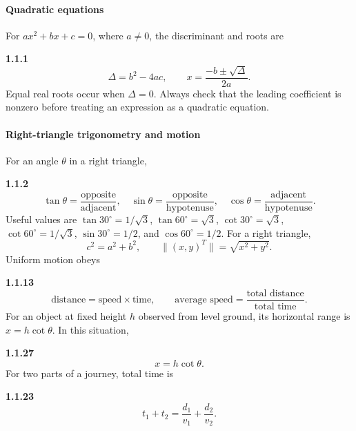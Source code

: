 \renewcommand{\theequation}{1.1.\arabic{qcurrent}.\arabic{equation}}
\setcounter{equation}{0}

\paragraph*{Quadratic equations}
For $ax^2+bx+c=0$, where $a\ne0$, the discriminant and roots are
\setcounter{qcurrent}{1}\setcounter{equation}{0}
\par\noindent\textbf{1.1.1}\quad
\begin{equation}
\Delta=b^2-4ac,\qquad x=\frac{-b\pm\sqrt{\Delta}}{2a}.
\label{eq:quad-general}
\end{equation}
Equal real roots occur when $\Delta=0$. Always check that the leading coefficient is nonzero before treating an expression as a quadratic equation.

\paragraph*{Right-triangle trigonometry and motion}
For an angle $\theta$ in a right triangle,
\setcounter{qcurrent}{2}\setcounter{equation}{0}
\par\noindent\textbf{1.1.2}\quad
\begin{equation}
\tan\theta=\frac{\text{opposite}}{\text{adjacent}},\quad
\sin\theta=\frac{\text{opposite}}{\text{hypotenuse}},\quad
\cos\theta=\frac{\text{adjacent}}{\text{hypotenuse}}.
\label{eq:trig-ratios}
\end{equation}
Useful values are $\tan30^\circ=1/\sqrt3$, $\tan60^\circ=\sqrt3$, $\cot30^\circ=\sqrt3$, $\cot60^\circ=1/\sqrt3$, $\sin30^\circ=1/2$, and $\cos60^\circ=1/2$. For a right triangle,
\[c^2=a^2+b^2,\qquad \|(x,y)^T\|=\sqrt{x^2+y^2}.\]
Uniform motion obeys
\setcounter{qcurrent}{13}\setcounter{equation}{0}
\par\noindent\textbf{1.1.13}\quad
\begin{equation}
\text{distance}=\text{speed}\times\text{time},\qquad
\text{average speed}=\frac{\text{total distance}}{\text{total time}}.
\label{eq:speed-time}
\end{equation}
For an object at fixed height $h$ observed from level ground, its horizontal range is $x=h\cot\theta$.
In this situation,
\par\noindent\textbf{1.1.27}\quad
\begin{equation}
x=h\cot\theta.\tag{1.1.27.1}\label{eq:horizontal-range}
\end{equation}
For two parts of a journey, total time is
\par\noindent\textbf{1.1.23}\quad
\begin{equation}
t_1+t_2=\frac{d_1}{v_1}+\frac{d_2}{v_2}.\tag{1.1.23.1}\label{eq:two-part-time}
\end{equation}

